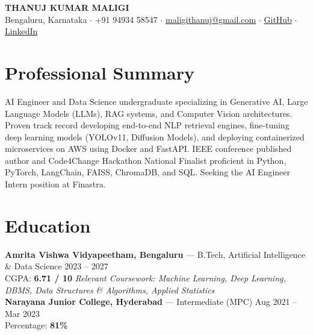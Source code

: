 \documentclass[a4paper,10pt]{article}
\begin{document}

\begin{center}
{\LARGE \textbf{THANUJ KUMAR MALIGI}}\\[1pt]
Bengaluru, Karnataka $\cdot$ +91 94934 58547 $\cdot$ \href{mailto:maligithanuj@gmail.com}{maligithanuj@gmail.com} $\cdot$ \href{https://github.com/ThanujMaligi}{GitHub} $\cdot$ \href{https://www.linkedin.com/in/thanuj-kumar-maligi-8882b2288}{LinkedIn}
\end{center}


\section*{Professional Summary}
AI Engineer and Data Science undergraduate specializing in Generative AI, Large Language Models (LLMs), RAG systems, and Computer Vision architectures. Proven track record developing end-to-end NLP retrieval engines, fine-tuning deep learning models (YOLOv11, Diffusion Models), and deploying containerized microservices on AWS using Docker and FastAPI. IEEE conference published author and Code4Change Hackathon National Finalist proficient in Python, PyTorch, LangChain, FAISS, ChromaDB, and SQL. Seeking the AI Engineer Intern position at Finastra.


\section*{Education}
\textbf{Amrita Vishwa Vidyapeetham, Bengaluru} --- B.Tech, Artificial Intelligence \& Data Science \hfill 2023 -- 2027\\
CGPA: \textbf{6.71 / 10} \hfill \textit{Relevant Coursework: Machine Learning, Deep Learning, DBMS, Data Structures \& Algorithms, Applied Statistics}\\
\textbf{Narayana Junior College, Hyderabad} --- Intermediate (MPC) \hfill Aug 2021 -- Mar 2023\\
Percentage: \textbf{81\%}

\end{document}
